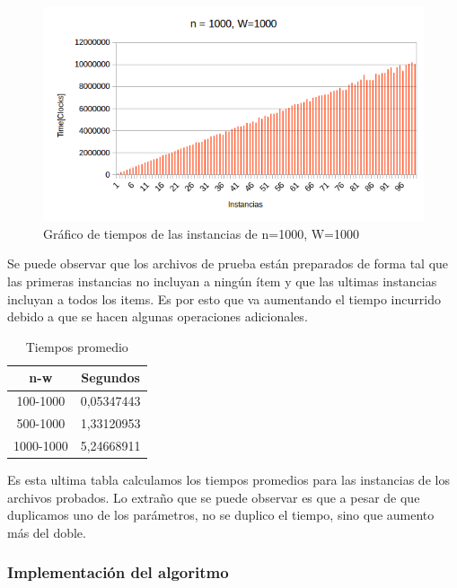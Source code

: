 \begin{figure}[H]
\centering
\includegraphics[width=\textwidth]{Mochila/1000_1000.png}
\caption{Gráfico de tiempos de las instancias de n=1000, W=1000}
\end{figure}

Se puede observar que los archivos de prueba están preparados de forma tal que las primeras instancias no incluyan a ningún ítem y que las ultimas instancias incluyan a todos los items. Es por esto que 
va aumentando el tiempo incurrido debido a que se hacen algunas operaciones adicionales.

\begin{table}[H]
\centering
\begin{tabular}{|c|c|}
\hline
\textbf{n-w} & \textbf{Segundos} \\ \hline
100-1000     & 0,05347443        \\ \hline
500-1000     & 1,33120953        \\ \hline
1000-1000    & 5,24668911        \\ \hline
\end{tabular}
\caption{Tiempos promedio}
\end{table}

Es esta ultima tabla calculamos los tiempos promedios para las instancias de los archivos probados.
Lo extraño que se puede observar es que a pesar de que duplicamos uno de los parámetros, no se duplico el tiempo, sino que aumento más del doble.

\newpage

\subsubsection{Implementación del algoritmo}







